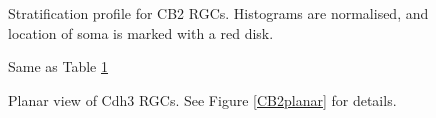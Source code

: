 \documentclass{article}
\begin{document}
\begin{figure}
  \centering
  \caption{Stratification profile for CB2 RGCs. Histograms are
    normalised, and location of soma is marked with a red disk. \label{CB2depth}}
\end{figure}

\clearpage

\begin{figure}
  \centering
  \caption{Same as Table \ref{CB2depth}}
\end{figure}

\clearpage


\begin{figure}
  \centering
  \caption{Planar view of Cdh3 RGCs. See Figure \ref{CB2planar} for details.}
\end{figure}
\end{document}
